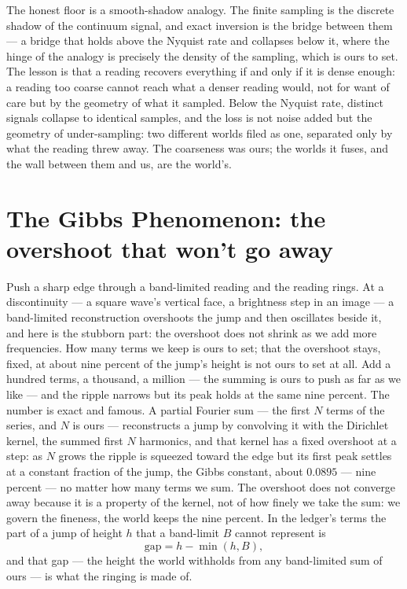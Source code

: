 The honest floor is a smooth-shadow analogy. The finite sampling is the discrete shadow of the continuum
signal, and exact inversion is the bridge between them --- a bridge that holds above the Nyquist rate and
collapses below it, where the hinge of the analogy is precisely the density of the sampling, which is ours to
set. The lesson is that a reading recovers everything if and only if it is dense enough: a reading too coarse
cannot reach what a denser reading would, not for want of care but by the geometry of what it sampled. Below
the Nyquist rate, distinct signals collapse to identical samples, and the loss is not noise added but the
geometry of under-sampling: two different worlds filed as one, separated only by what the reading threw away.
The coarseness was ours; the worlds it fuses, and the wall between them and us, are the world's.

\section{The Gibbs Phenomenon: the overshoot that won't go away}
\label{se:gibbs}

Push a sharp edge through a band-limited reading and the reading rings. At a discontinuity --- a square wave's
vertical face, a brightness step in an image --- a band-limited reconstruction overshoots the jump and then
oscillates beside it, and here is the stubborn part: the overshoot does not shrink as we add more frequencies.
How many terms we keep is ours to set; that the overshoot stays, fixed, at about nine percent of the jump's
height is not ours to set at all. Add a hundred terms, a thousand, a million --- the summing is ours to push as
far as we like --- and the ripple narrows but its peak holds at the same nine percent. The number is exact and
famous. A partial Fourier sum --- the first $N$ terms of the series, and $N$ is ours --- reconstructs a jump by
convolving it with the Dirichlet kernel, the summed first $N$ harmonics, and that kernel has a fixed overshoot
at a step: as $N$ grows the ripple is squeezed toward the edge but its first peak settles at a constant
fraction of the jump, the Gibbs constant, about $0.0895$ --- nine percent --- no matter how many terms we sum.
The overshoot does not converge away because it is a property of the kernel, not of how finely we take the sum:
we govern the fineness, the world keeps the nine percent. In the ledger's terms the part of a jump of height
$h$ that a band-limit $B$ cannot represent is
\begin{equation}
  \mathrm{gap} = h - \min(h, B),
\end{equation}
and that gap --- the height the world withholds from any band-limited sum of ours --- is what the ringing is
made of.

